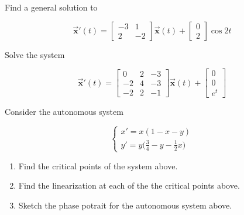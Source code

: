 \begin{mdframed}
    \vspace{-0.25cm}
    \hspace{-0.25cm}
    \begin{Exercise}
        Find a general solution to 

        \[
            \overrightarrow{\mathbf{x}}'(t) = \begin{bmatrix}
                -3 & 1 \\ 2 & -2
            \end{bmatrix} \overrightarrow{\mathbf{x}}(t) + \begin{bmatrix}
                0 \\ 2
            \end{bmatrix} \cos 2t
        \]
    \end{Exercise}

    \begin{Exercise}
        Solve the system

        \[
            \overrightarrow{\mathbf{x}}'(t) = \begin{bmatrix}
                0 & 2 & -3 \\ -2 & 4 & -3 \\ -2 & 2 & -1
            \end{bmatrix} \overrightarrow{\mathbf{x}}(t) + \begin{bmatrix}
                0 \\ 0 \\ e^t
            \end{bmatrix}
        \]
    \end{Exercise}


    \begin{Exercise}
        Consider the autonomous system

        \[
            \begin{cases}
                x' = x(1 - x - y)\\
                y' = \displaystyle y\biggl(\frac{3}{4} - y -\frac{1}{2}x \biggr)
            \end{cases}
        \]

        \begin{enumerate}
            \item Find the critical points of the system above.
            \item Find the linearization at each of the the critical points above.
            \item Sketch the phase potrait for the autonomous system above.
        \end{enumerate}
    \end{Exercise}
\end{mdframed}